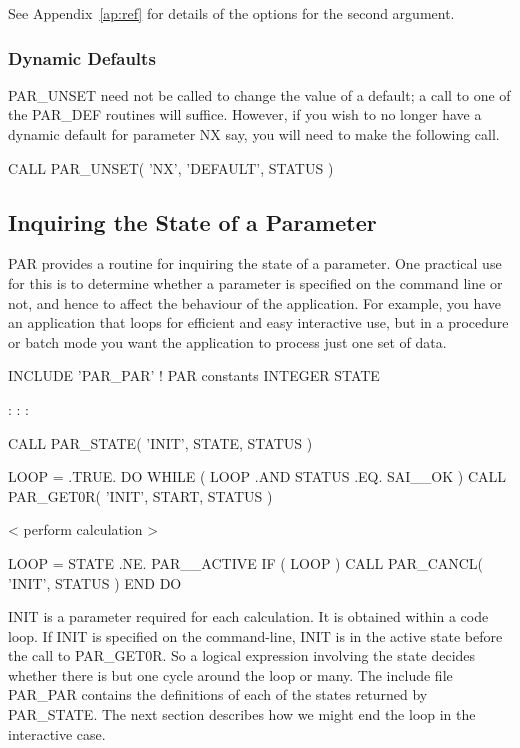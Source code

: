 \documentclass[twoside,11pt,nolof]{starlink}
\begin{document}
See Appendix~\ref{ap:ref} for details of the options for the second
argument.

\subsubsection{Dynamic Defaults}

PAR\_UNSET need not be called to change the value of a default; a call
to one of the PAR\_DEF routines will suffice.  However, if you wish to
no longer have a dynamic default for parameter NX say, you will need to
make the following call.

\begin{terminalv}
CALL PAR_UNSET( 'NX', 'DEFAULT', STATUS )
\end{terminalv}

\subsection{Inquiring the State of a Parameter}

PAR provides a routine for inquiring the state of a parameter.
One practical use for this is to determine whether a parameter is
specified on the command line or not, and hence to affect the behaviour
of the application.  For example, you have an application that loops for
efficient and easy interactive use, but in a procedure or batch mode you
want the application to process just one set of data.

\begin{terminalv}
      INCLUDE 'PAR_PAR'        ! PAR constants
      INTEGER STATE

          :       :       :

      CALL PAR_STATE( 'INIT', STATE, STATUS )

      LOOP = .TRUE.
      DO WHILE ( LOOP .AND STATUS .EQ. SAI__OK )
         CALL PAR_GET0R( 'INIT', START, STATUS )

            < perform calculation >

         LOOP = STATE .NE. PAR__ACTIVE
         IF ( LOOP ) CALL PAR_CANCL( 'INIT', STATUS )
      END DO
\end{terminalv}

INIT is a parameter required for each calculation.  It is obtained
within a code loop.  If INIT is specified on the command-line, INIT is
in the active state before the call to PAR\_GET0R.  So a logical
expression involving the state decides whether there is but one cycle
around the loop or many.  The include file PAR\_PAR contains the
definitions of each of the states returned by PAR\_STATE. The next
section describes how we might end the loop in the interactive case.
\end{document}
